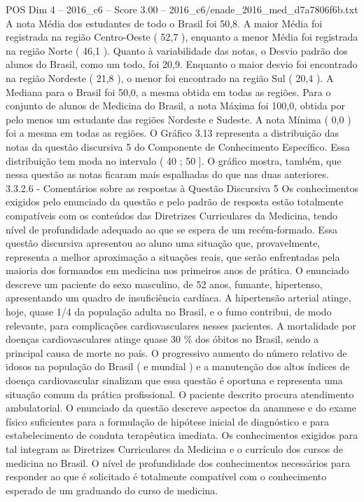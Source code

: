 \begin{textsample}{POS Dim 4 – 2016\_c6 – Score 3.00 – 2016\_c6/enade\_2016\_med\_d7a7806f6b.txt}
A nota Média dos estudantes de todo o Brasil foi 50,8.
A maior Média foi registrada na região Centro-Oeste ( 52,7 ), enquanto a menor Média foi registrada na região Norte ( 46,1 ).
Quanto à variabilidade das notas, o Desvio padrão dos alunos do Brasil, como um todo, foi 20,9.
Enquanto o maior desvio foi encontrado na região Nordeste ( 21,8 ), o menor foi encontrado na região Sul ( 20,4 ).
A Mediana para o Brasil foi 50,0, a mesma obtida em todas as regiões.
Para o conjunto de alunos de Medicina do Brasil, a nota Máxima foi 100,0, obtida por pelo menos um estudante das regiões Nordeste e Sudeste.
A nota Mínima ( 0,0 ) foi a mesma em todas as regiões.
O Gráfico 3.13 representa a distribuição das notas da questão discursiva 5 do Componente de Conhecimento Específico.
Essa distribuição tem moda no intervalo ( 40 ; 50 ].
O gráfico mostra, também, que nessa questão as notas ficaram mais espalhadas do que nas duas anteriores. 3.3.2.6 - Comentários sobre as respostas à Questão Discursiva 5 Os conhecimentos exigidos pelo enunciado da questão e pelo padrão de resposta estão totalmente compatíveis com os conteúdos das Diretrizes Curriculares da Medicina, tendo nível de profundidade adequado ao que se espera de um recém-formado.
Essa questão discursiva apresentou ao aluno uma situação que, provavelmente, representa a melhor aproximação a situações reais, que serão enfrentadas pela maioria dos formandos em medicina nos primeiros anos de prática.
O enunciado descreve um paciente do sexo masculino, de 52 anos, fumante, hipertenso, apresentando um quadro de insuficiência cardíaca.
A hipertensão arterial atinge, hoje, quase 1/4 da população adulta no Brasil, e o fumo contribui, de modo relevante, para complicações cardiovasculares nesses pacientes.
A mortalidade por doenças cardiovasculares atinge quase 30 \% dos óbitos no Brasil, sendo a principal causa de morte no país.
O progressivo aumento do número relativo de idosos na população do Brasil ( e mundial ) e a manutenção dos altos índices de doença cardiovascular sinalizam que essa questão é oportuna e representa uma situação comum da prática profissional.
O paciente descrito procura atendimento ambulatorial.
O enunciado da questão descreve aspectos da anamnese e do exame físico suficientes para a formulação de hipótese inicial de diagnóstico e para estabelecimento de conduta terapêutica imediata.
Os conhecimentos exigidos para tal integram as Diretrizes Curriculares da Medicina e o currículo dos cursos de medicina no Brasil.
O nível de profundidade dos conhecimentos necessários para responder ao que é solicitado é totalmente compatível com o conhecimento esperado de um graduando do curso de medicina.

\end{textsample}
